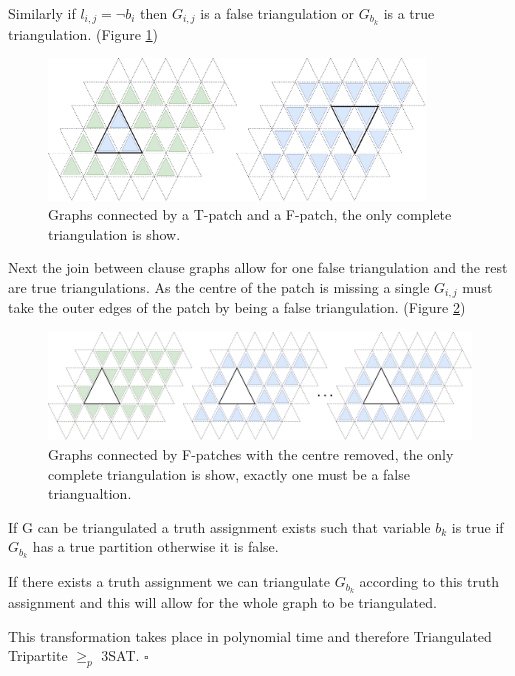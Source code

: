 \documentclass[a4paper,11pt]{report}
\begin{document}
Similarly if  $l_{i,j}=\neg b_i$ then $G_{i,j}$ is a false triangulation or $G_{b_k}$ is a true triangulation. (Figure \ref{holyertwo})

\begin{figure}[h!]
\begin{center}
		\includegraphics[width=100mm]{figures/lemma_two_holyer.png}
\end{center}
		\caption{Graphs connected by a T-patch and a F-patch, the only complete triangulation is show.}
\label{holyertwo}
\end{figure}

Next the join between clause graphs allow for one false triangulation and the rest  are true triangulations. As the centre of the patch is missing a single $G_{i,j}$ must take the outer edges of the patch by being a false triangulation. (Figure \ref{holyerthree})

\begin{figure}[h!]
\begin{center}
		\includegraphics[width=120mm]{figures/lemma_three_holyer.png}
\end{center}
		\caption{Graphs connected by F-patches with the centre removed, the only complete triangulation is show, exactly one must be a false triangualtion.}
\label{holyerthree}
\end{figure}

If G can be triangulated a truth assignment exists such that variable $b_k$ is true if $G_{b_k}$ has a true partition otherwise it is false.

If there exists a truth assignment we can triangulate $G_{b_k}$ according to this truth assignment and this will allow for the whole graph to be triangulated.

This transformation takes place in polynomial time and therefore Triangulated Tripartite $\geq_p$ 3SAT. $\square$
\end{document}
